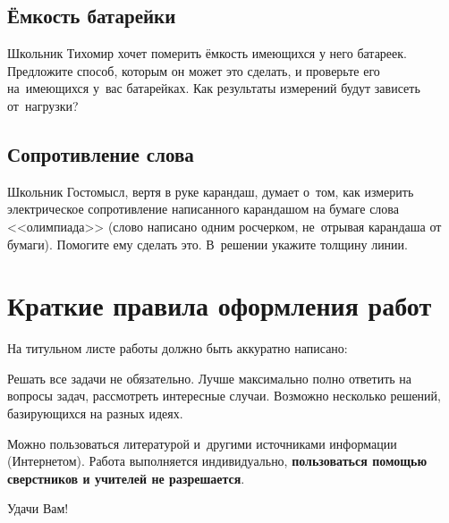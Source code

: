 \documentclass[a4paper,12pt]{article}
\begin{document}
\subsection{Ёмкость батарейки}
Школьник Тихомир хочет померить ёмкость имеющихся у него батареек. Предложите способ,
которым он может это сделать, и проверьте его на~имеющихся у~вас батарейках.
Как результаты измерений будут зависеть от~нагрузки?

\subsection{Сопротивление слова}
Школьник Гостомысл, вертя в руке карандаш, думает о~том, как измерить электрическое
сопротивление написанного карандашом на бумаге слова <<олимпиада>> (слово написано
одним росчерком, не~отрывая карандаша от бумаги). Помогите ему сделать это.
В~решении укажите толщину линии.

\newpage

\section*{Краткие правила оформления работ}

\footnotesize

На титульном листе работы должно быть аккуратно написано:

Решать все задачи не обязательно. Лучше максимально полно ответить на вопросы задач,
рассмотреть интересные случаи. Возможно несколько решений, базирующихся
на разных идеях.

Можно пользоваться литературой и~другими источниками информации (Интернетом).
Работа выполняется индивидуально, \textbf{пользоваться помощью сверстников и учителей не разрешается}.



\bigskip
\normalsize

Удачи Вам!
\end{document}
